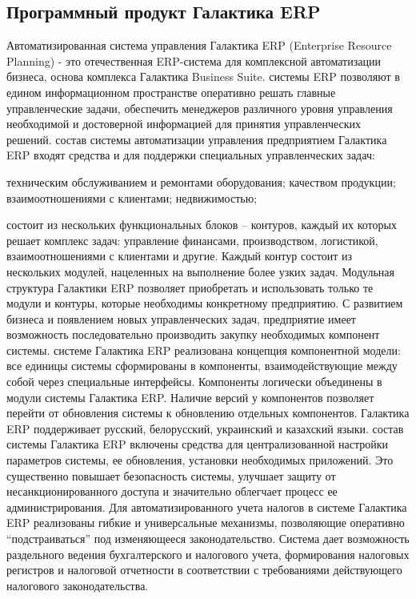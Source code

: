 \documentclass[14pt,a4paper]{reportmod}
\begin{document}
\subsection{Программный продукт Галактика ERP}
Автоматизированная система управления Галактика ERP (Enterprise Resource Planning) - это отечественная ERP-система для комплексной автоматизации бизнеса, основа комплекса Галактика Business Suite.
 системы ERP позволяют в едином информационном пространстве оперативно решать главные управленческие задачи, обеспечить менеджеров различного уровня управления необходимой и достоверной информацией для принятия управленческих решений.
 состав системы автоматизации управления предприятием Галактика ERP входят средства и для поддержки специальных управленческих задач:
\begin{itemize}
   техническим обслуживанием и ремонтами оборудования;
   качеством продукции;
   взаимоотношениями с клиентами;
   недвижимостью;
\end{itemize}
 состоит из нескольких функциональных блоков – контуров, каждый их которых решает комплекс задач: управление финансами, производством, логистикой, взаимоотношениями с клиентами и другие. Каждый контур состоит из нескольких модулей, нацеленных на выполнение более узких задач. Модульная структура Галактики ERP позволяет приобретать и использовать только те модули и контуры, которые необходимы конкретному предприятию. С развитием бизнеса и появлением новых управленческих задач, предприятие имеет возможность последовательно производить закупку необходимых компонент системы.
 системе Галактика ERP реализована концепция компонентной модели: все единицы системы сформированы в компоненты, взаимодействующие между собой через специальные интерфейсы. Компоненты логически объединены в модули системы Галактика ERP. Наличие версий у компонентов позволяет перейти от обновления системы к обновлению отдельных компонентов.
 Галактика ERP поддерживает русский, белорусский, украинский и казахский языки.
 состав системы Галактика ERP включены средства для централизованной настройки параметров системы, ее обновления, установки необходимых приложений. Это существенно повышает безопасность системы, улучшает защиту от несанкционированного доступа и значительно облегчает процесс ее администрирования.
Для автоматизированного учета налогов в системе Галактика ERP реализованы гибкие и универсальные механизмы, позволяющие оперативно ``подстраиваться'' под изменяющееся законодательство. Система дает возможность раздельного ведения бухгалтерского и налогового учета, формирования налоговых регистров и налоговой отчетности в соответствии с требованиями действующего налогового законодательства.
\end{document}
